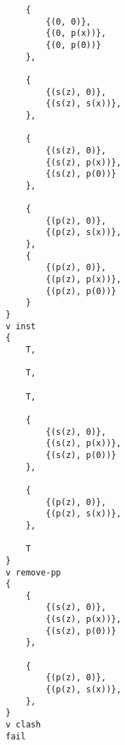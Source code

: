 \begin{multicols}{2}
\begin{verbatim}
    {
        {(0, 0)},  
        {(0, p(x))}, 
        {(0, p(0))}
    },

    {
        {(s(z), 0)}, 
        {(s(z), s(x))}, 
    },

    {
        {(s(z), 0)},  
        {(s(z), p(x))}, 
        {(s(z), p(0))}
    },

    {
        {(p(z), 0)}, 
        {(p(z), s(x))}, 
    },
    {
        {(p(z), 0)},  
        {(p(z), p(x))}, 
        {(p(z), p(0))}
    }
}
v inst
{
    T,

    T,

    T,

    {
        {(s(z), 0)},  
        {(s(z), p(x))}, 
        {(s(z), p(0))}
    },

    {
        {(p(z), 0)}, 
        {(p(z), s(x))}, 
    },

    T
}
v remove-pp
{
    {
        {(s(z), 0)},  
        {(s(z), p(x))}, 
        {(s(z), p(0))}
    },

    {
        {(p(z), 0)}, 
        {(p(z), s(x))}, 
    },
}
v clash
fail
\end{verbatim}
\end{multicols}
\fi
